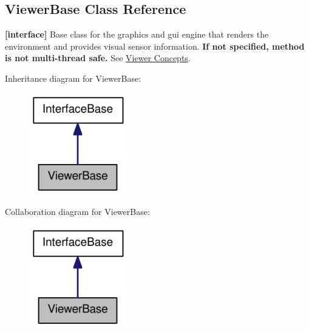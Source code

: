 \hypertarget{classOpenRAVE_1_1ViewerBase}{
\subsection{ViewerBase Class Reference}
\label{classOpenRAVE_1_1ViewerBase}
}


{\bfseries \mbox{[}interface\mbox{]}} Base class for the graphics and gui engine that renders the environment and provides visual sensor information. {\bfseries If not specified, method is not multi-\/thread safe.} See \hyperlink{arch__viewer}{Viewer Concepts}.  




Inheritance diagram for ViewerBase:\nopagebreak
\begin{figure}[H]
\begin{center}
\leavevmode
\includegraphics[width=120pt]{classOpenRAVE_1_1ViewerBase__inherit__graph}
\end{center}
\end{figure}


Collaboration diagram for ViewerBase:\nopagebreak
\begin{figure}[H]
\begin{center}
\leavevmode
\includegraphics[width=120pt]{classOpenRAVE_1_1ViewerBase__coll__graph}
\end{center}
\end{figure}
